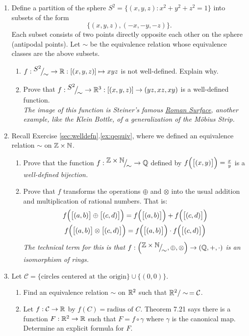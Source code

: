 \begin{exercises}{}{}
\begin{enumerate}
	\item Define a partition of the sphere $S^2=\bigl\{(x,y,z):x^2+y^2+z^2=1\bigr\}$ into subsets of the form
	\[\bigl\{(x,y,z),(-x,-y,-z)\bigr\}.\]
	Each subset consists of two points directly opposite each other on the sphere (antipodal points). Let $\sim$ be the equivalence relation whose equivalence classes are the above subsets.
		\begin{enumerate}
	  	\item $f:{}^{\textstyle {S^2}}\!\big/_{\textstyle \!{\sim}}\to\mathbb{R}:[(x,y,z)]\mapsto xyz$ is not well-defined. Explain why.
	  	\item Prove that $f:{}^{\textstyle {S^2}}\!\big/_{\textstyle \!{\sim}}\to\mathbb{R}^3:[(x,y,z)]\to(yz,xz,xy)$ is a well-defined function.\\
			\emph{The image of this function is Steiner's famous \href{http://en.wikipedia.org/wiki/Roman_surface}{Roman Surface}, another example, like the Klein Bottle, of a generalization of the M\"obius Strip.}
		\end{enumerate}
		
		\item Recall Exercise \ref*{sec:welldefn}.\ref{ex:qequiv}, where we defined an equivalence relation $\sim$ on $\mathbb{Z}\times\mathbb{N}$.
		\begin{enumerate}
			\item	Prove that the function $f:{}^{\textstyle {\mathbb{Z}\times\mathbb{N}}}\!\big/_{\textstyle \!{\sim}}\to\mathbb{Q}$ defined by $f\Bigl(\bigl[(x,y)\bigr]\Bigr)=\frac xy$ is a \emph{well-defined bijection.}
			\item Prove that $f$ transforms the operations $\oplus$ and $\otimes$ into the usual addition and multiplication of rational numbers. That is:
			\begin{gather*}
			f\Bigl(\bigl[(a,b)\bigr]\oplus\bigl[(c,d)\bigr]\Bigr)=f\Bigl(\bigl[(a,b)\bigr]\Bigr)+f\Bigl(\bigl[(c,d)\bigr]\Bigr)\\
			f\Bigl(\bigl[(a,b)\bigr]\otimes\bigl[(c,d)\bigr]\Bigr)=f\Bigl(\bigl[(a,b)\bigr]\Bigr)\cdot f\Bigl(\bigl[(c,d)\bigr]\Bigr)
			\end{gather*}
			\emph{The technical term for this is that $f:\left({}^{\textstyle {\mathbb{Z}\times\mathbb{N}}}\!\big/_{\textstyle \!{\sim}},\oplus,\otimes\right)\to(\mathbb{Q},+,\cdot)$ is an isomorphism of rings.}
		\end{enumerate}
		
		
				\item Let $\mathcal{C} = \{\text{circles centered at the origin}\} \cup \{(0,0)\}$.
\begin{enumerate}
    \item Find an equivalence relation $\sim$ on $\mathbb{R}^2$ such that $\mathbb{R}^2/\sim \, = \mathcal{C}$.
    \item Let $f : \mathcal{C} \to \mathbb{R}$ by $f(C) = \text{radius of } C$. Theorem 7.21 says there is a function $F : \mathbb{R}^2 \to \mathbb{R}$ such that $F = f \circ \gamma$ where $\gamma$ is the canonical map. Determine an explicit formula for $F$.
\end{enumerate}


\end{enumerate}
\end{exercises}
